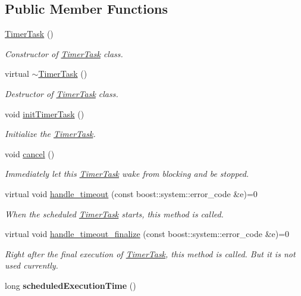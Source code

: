 \subsection*{Public Member Functions}
\begin{DoxyCompactItemize}
\item 
\hyperlink{class_e_l_f_i_n_1_1_timer_task_ae0139d0b04ff7b5b0d9fbeac6759a078}{Timer\-Task} ()
\begin{DoxyCompactList}\small\item\em Constructor of \hyperlink{class_e_l_f_i_n_1_1_timer_task}{Timer\-Task} class. \end{DoxyCompactList}\item 
virtual \hyperlink{class_e_l_f_i_n_1_1_timer_task_a6c9a10f40780e8471379d3a3233fbf25}{$\sim$\-Timer\-Task} ()
\begin{DoxyCompactList}\small\item\em Destructor of \hyperlink{class_e_l_f_i_n_1_1_timer_task}{Timer\-Task} class. \end{DoxyCompactList}\item 
void \hyperlink{class_e_l_f_i_n_1_1_timer_task_ad63f85de09b990fffc4a6336446f8bf0}{init\-Timer\-Task} ()
\begin{DoxyCompactList}\small\item\em Initialize the \hyperlink{class_e_l_f_i_n_1_1_timer_task}{Timer\-Task}. \end{DoxyCompactList}\item 
void \hyperlink{class_e_l_f_i_n_1_1_timer_task_aa60dedafaff878ad1a6632c017d08c17}{cancel} ()
\begin{DoxyCompactList}\small\item\em Immediately let this \hyperlink{class_e_l_f_i_n_1_1_timer_task}{Timer\-Task} wake from blocking and be stopped. \end{DoxyCompactList}\item 
virtual void \hyperlink{class_e_l_f_i_n_1_1_timer_task_a404ec0115c2d3ac785f11cf2b3d421d8}{handle\-\_\-timeout} (const boost\-::system\-::error\-\_\-code \&e)=0
\begin{DoxyCompactList}\small\item\em When the scheduled \hyperlink{class_e_l_f_i_n_1_1_timer_task}{Timer\-Task} starts, this method is called. \end{DoxyCompactList}\item 
virtual void \hyperlink{class_e_l_f_i_n_1_1_timer_task_ae759ef0244d8588a2eefaf22f0db8ff4}{handle\-\_\-timeout\-\_\-finalize} (const boost\-::system\-::error\-\_\-code \&e)=0
\begin{DoxyCompactList}\small\item\em Right after the final execution of \hyperlink{class_e_l_f_i_n_1_1_timer_task}{Timer\-Task}, this method is called. But it is not used currently. \end{DoxyCompactList}\item 
\hypertarget{class_e_l_f_i_n_1_1_timer_task_abed8eb97b38455e4a619706378b5bf89}{long {\bfseries scheduled\-Execution\-Time} ()}\label{class_e_l_f_i_n_1_1_timer_task_abed8eb97b38455e4a619706378b5bf89}


\end{DoxyCompactItemize}
